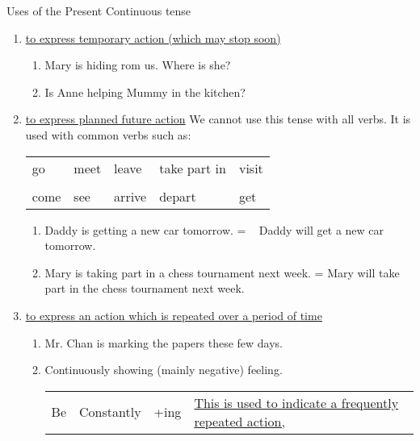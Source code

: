 Uses of the Present Continuous tense
\begin{enumerate}
    \item \underline{to express temporary action (which may stop soon)}
        \begin{enumerate}
            \item Mary is hiding rom us. Where is she?
            \item Is Anne helping Mummy in the kitchen?
        \end{enumerate}
    \item \underline{to express planned future action} \newline
        We cannot use this tense with all verbs.
        It is used with common verbs such as:
        \begin{center}
        \begin{tabular}{lllll}
            go & meet & leave & take part in & visit \\
            & & & & \\
            come & see & arrive & depart & get
        \end{tabular}
        \end{center}
        \begin{enumerate}
            \item Daddy is getting a new car tomorrow. \newline
                = ~ Daddy will get a new car tomorrow.
            \item Mary is taking part in a chess tournament next week. \newline
                = Mary will take part in the chess tournament next week.
        \end{enumerate}
    \item \underline{to express an action which is repeated over a period of time}
        \begin{enumerate}
            \item Mr. Chan is marking the papers these few days. \newline
            \item Continuously showing (mainly negative) feeling. \newline
                \begin{tabular}{cccl}
                    \multirow{3}{*}{Be}
                    & Constantly
                    & \multirow{3}{*}{+ing}
                    & \underline{This is used to indicate a frequently repeated action,}\\

\end{tabular}
\end{enumerate}
\end{enumerate}
